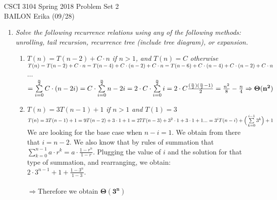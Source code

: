 \documentclass[12pt]{article} \setlength{\oddsidemargin}{0in}
\begin{document}
CSCI 3104 Spring 2018 \hfill Problem Set 2\\
BAILON Erika (09/28)

\hrulefill

\begin{enumerate} [label=\textbf{\arabic*}.]

\item \textit{Solve the following recurrence relations using any of
    the following methods: unrolling, tail recursion, recurrence tree
    (include tree diagram), or expansion.}

  
  \begin{enumerate} [label=\textbf{\alph*})]
  \item \textit{$T(n)=T(n-2)+C \cdot n$ if $n>1$, and $T(n)=C$ otherwise}\\ %
    
   $T(n) = T(n-2) + C \cdot n \\
    = T(n-4) + C \cdot (n-2) + C \cdot n \\
    = T(n-6) +  C \cdot (n-4) + C \cdot (n-2) + C \cdot n$ \\
     ... \\
  $=  \sum\limits_{i=0}^{\frac{n}{2}} C \cdot (n-2i) \\
  = C \cdot \sum\limits_{i=0}^{\frac{n}{2}}  n-2i \\
  = 2 \cdot C \cdot \sum\limits_{i=0}^{\frac{n}{2}} i 
  = 2 \cdot C\frac {(\frac{n}{2})(\frac{n}{2} - 1)}{2} = \frac{n^2}{8} - \frac{n}{4} \Rightarrow \mathbf {\Theta (n^2)}$\\
    
  \item \textit{$T(n)=3T(n-1)+1$ if $n>1$ and $T(1)=3$}\\ %

    $T(n)=3T(n-1)+1\\
    = 9T(n-2) +3\cdot 1 + 1 \\
    = 27T(n-3) + 3^2 \cdot 1 + 3 \cdot 1 +1\\
    ... \\
    = 3^i T(n-i) + \Big(\sum\limits_{k=0}^{i-1} 3^k \Big) + 1$\\
    We are looking for the base case when $n-i = 1$. We obtain from there that $ i = n-2$. We also know that by rules of summation that  $\sum\limits_{k=0}^{n-1} a\cdot r^k = a \cdot \frac{1-r^n}{1-r}$. Plugging the value of $i$ and the solution for that type of summation, and rearranging, we obtain: \\
  $ 2\cdot 3^{n-1}+1 +\frac{1-3^n}{1-3}$.  \\\\ $\Rightarrow$Therefore we obtain $\mathbf {\Theta(3^n)}$
    

\end{enumerate}
\end{enumerate}
\end{document}
